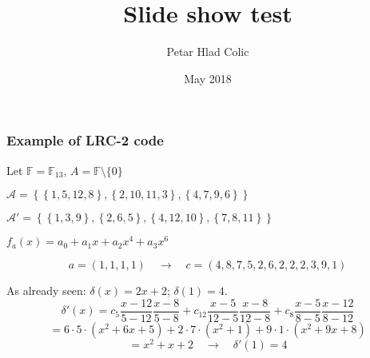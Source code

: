 \documentclass[envcountsect]{beamer}
\title{Slide show test}
\author{Petar Hlad Colic}
\institute{Universitat Polit\`ecnica de Catalunya}
\date{May 2018}
\newcommand{\FF}{\mathbb{F}}
\begin{document}
    \frame{\titlepage}
    
    
    
    
    
    
    
    \begin{frame}
        \frametitle{Example of LRC-2 code}
        
        Let $\FF = \FF_{13}$, $A = \FF \setminus \{0\}$
        
        $\mathcal{A} = \left\lbrace  \left\lbrace 1, 5, 12 , 8 \right\rbrace, \left\lbrace 2 , 10 , 11 , 3 \right\rbrace , \left\lbrace 4 , 7 , 9 , 6 \right\rbrace \right\rbrace$
        
        $\mathcal{A'} = \left\lbrace  \left\lbrace 1 , 3 , 9 \right\rbrace, \left\lbrace 2 , 6 , 5 \right\rbrace , \left\lbrace 4 , 12 , 10 \right\rbrace , \left\lbrace 7 , 8 , 11 \right\rbrace \right\rbrace$
        
        $f_a(x) = a_0 + a_1 x + a_2 x^4 + a_3 x^6$
        
        $$a = (1,1,1,1) \quad \longrightarrow \quad c = (4,8,7,5,2,6,2,2,2,3,9,1)$$
        
        As already seen: $\delta(x) = 2x + 2$; $\delta(1)=4$.
        $$\delta ' (x) = c_5 \frac{x-12}{5-12}\frac{x-8}{5-8} + c_{12} \frac{x-5}{12-5}\frac{x-8}{12-8} + c_8 \frac{x-5}{8-5}\frac{x-12}{8-12}$$
        $$ = 6 \cdot 5 \cdot (x^2 + 6x + 5) + 2 \cdot 7 \cdot (x^2 + 1) + 9 \cdot 1 \cdot (x^2 + 9x + 8)$$
        $$ = x^2 + x + 2 \quad \longrightarrow \quad \delta ' (1) = 4$$
    \end{frame}        
    
    
\end{document}

